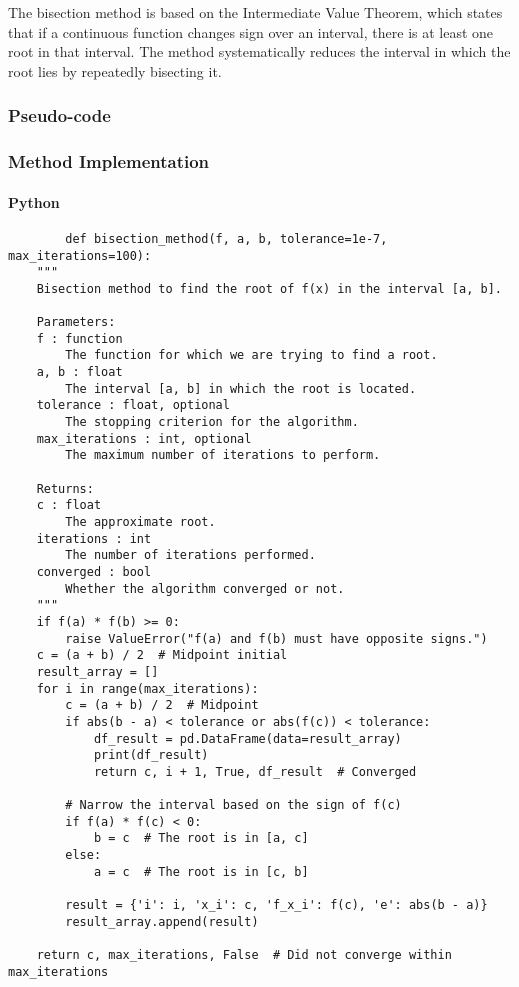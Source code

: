 \documentclass{article}
\begin{document}
    The bisection method is based on the Intermediate Value Theorem, which states that if a continuous function changes
    sign over an interval, there is at least one root in that interval. The method systematically reduces the interval
    in which the root lies by repeatedly bisecting it.

    \subsubsection{Pseudo-code}

    \subsubsection{Method Implementation}
    \paragraph{Python}

    \begin{verbatim}
        def bisection_method(f, a, b, tolerance=1e-7, max_iterations=100):
    """
    Bisection method to find the root of f(x) in the interval [a, b].

    Parameters:
    f : function
        The function for which we are trying to find a root.
    a, b : float
        The interval [a, b] in which the root is located.
    tolerance : float, optional
        The stopping criterion for the algorithm.
    max_iterations : int, optional
        The maximum number of iterations to perform.

    Returns:
    c : float
        The approximate root.
    iterations : int
        The number of iterations performed.
    converged : bool
        Whether the algorithm converged or not.
    """
    if f(a) * f(b) >= 0:
        raise ValueError("f(a) and f(b) must have opposite signs.")
    c = (a + b) / 2  # Midpoint initial
    result_array = []
    for i in range(max_iterations):
        c = (a + b) / 2  # Midpoint
        if abs(b - a) < tolerance or abs(f(c)) < tolerance:
            df_result = pd.DataFrame(data=result_array)
            print(df_result)
            return c, i + 1, True, df_result  # Converged

        # Narrow the interval based on the sign of f(c)
        if f(a) * f(c) < 0:
            b = c  # The root is in [a, c]
        else:
            a = c  # The root is in [c, b]

        result = {'i': i, 'x_i': c, 'f_x_i': f(c), 'e': abs(b - a)}
        result_array.append(result)

    return c, max_iterations, False  # Did not converge within max_iterations

    \end{verbatim}
\end{document}
